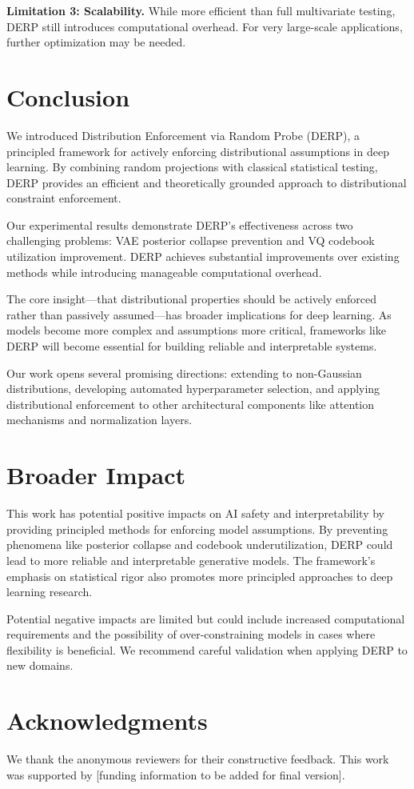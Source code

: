\documentclass{article}
\begin{document}
\textbf{Limitation 3: Scalability.} While more efficient than full multivariate testing, DERP still introduces computational overhead. For very large-scale applications, further optimization may be needed.

\section{Conclusion}

We introduced Distribution Enforcement via Random Probe (DERP), a principled framework for actively enforcing distributional assumptions in deep learning. By combining random projections with classical statistical testing, DERP provides an efficient and theoretically grounded approach to distributional constraint enforcement.

Our experimental results demonstrate DERP's effectiveness across two challenging problems: VAE posterior collapse prevention and VQ codebook utilization improvement. DERP achieves substantial improvements over existing methods while introducing manageable computational overhead.

The core insight—that distributional properties should be actively enforced rather than passively assumed—has broader implications for deep learning. As models become more complex and assumptions more critical, frameworks like DERP will become essential for building reliable and interpretable systems.

Our work opens several promising directions: extending to non-Gaussian distributions, developing automated hyperparameter selection, and applying distributional enforcement to other architectural components like attention mechanisms and normalization layers.

\section*{Broader Impact}

This work has potential positive impacts on AI safety and interpretability by providing principled methods for enforcing model assumptions. By preventing phenomena like posterior collapse and codebook underutilization, DERP could lead to more reliable and interpretable generative models. The framework's emphasis on statistical rigor also promotes more principled approaches to deep learning research.

Potential negative impacts are limited but could include increased computational requirements and the possibility of over-constraining models in cases where flexibility is beneficial. We recommend careful validation when applying DERP to new domains.

\section*{Acknowledgments}

We thank the anonymous reviewers for their constructive feedback. This work was supported by [funding information to be added for final version].

\small


\end{document}
